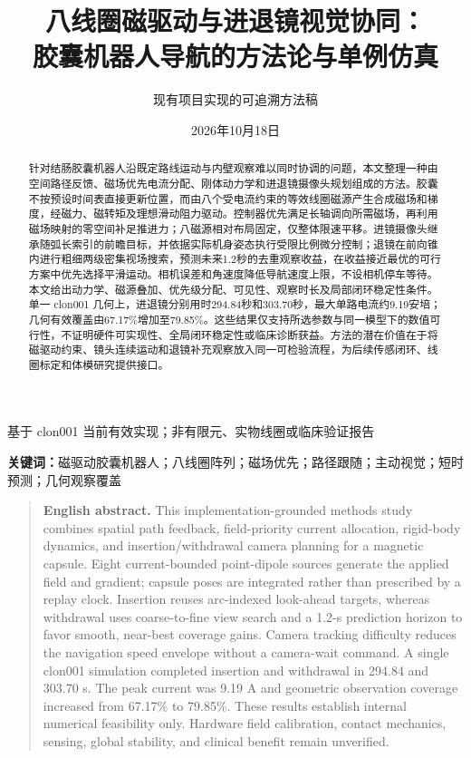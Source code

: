 \documentclass[UTF8,a4paper,zihao=5,fontset=windows]{ctexart}
\title{\heiti 八线圈磁驱动与进退镜视觉协同：\\胶囊机器人导航的方法论与单例仿真}
\author{现有项目实现的可追溯方法稿}
\date{2026年10月18日}
\begin{document}
\maketitle\vspace{-1em}
\begin{center}\small 基于 clon001 当前有效实现；非有限元、实物线圈或临床验证报告\end{center}
\begin{abstract}
针对结肠胶囊机器人沿既定路线运动与内壁观察难以同时协调的问题，本文整理一种由空间路径反馈、磁场优先电流分配、刚体动力学和进退镜摄像头规划组成的方法。胶囊不按预设时间表直接更新位置，而由八个受电流约束的等效线圈磁源产生合成磁场和梯度，经磁力、磁转矩及理想滑动阻力驱动。控制器优先满足长轴调向所需磁场，再利用磁场映射的零空间补足推进力；八磁源相对布局固定，仅整体限速平移。进镜摄像头继承随弧长索引的前瞻目标，并依据实际机身姿态执行受限比例微分控制；退镜在前向锥内进行粗细两级密集视场搜索，预测未来1.2秒的去重观察收益，在收益接近最优的可行方案中优先选择平滑运动。相机误差和角速度降低导航速度上限，不设相机停车等待。本文给出动力学、磁源叠加、优先级分配、可见性、观察时长及局部闭环稳定性条件。单一 clon001 几何上，进退镜分别用时294.84秒和303.70秒，最大单路电流约9.19安培；几何有效覆盖由67.17\%增加至79.85\%。这些结果仅支持所选参数与同一模型下的数值可行性，不证明硬件可实现性、全局闭环稳定性或临床诊断获益。方法的潜在价值在于将磁驱动约束、镜头连续运动和退镜补充观察放入同一可检验流程，为后续传感闭环、线圈标定和体模研究提供接口。
\end{abstract}
\noindent\textbf{关键词：}磁驱动胶囊机器人；八线圈阵列；磁场优先；路径跟随；主动视觉；短时预测；几何观察覆盖
\begin{quote}\small
\textbf{English abstract.} This implementation-grounded methods study combines spatial path feedback, field-priority current allocation, rigid-body dynamics, and insertion/withdrawal camera planning for a magnetic capsule. Eight current-bounded point-dipole sources generate the applied field and gradient; capsule poses are integrated rather than prescribed by a replay clock. Insertion reuses arc-indexed look-ahead targets, whereas withdrawal uses coarse-to-fine view search and a 1.2-s prediction horizon to favor smooth, near-best coverage gains. Camera tracking difficulty reduces the navigation speed envelope without a camera-wait command. A single clon001 simulation completed insertion and withdrawal in 294.84 and 303.70 s. The peak current was 9.19 A and geometric observation coverage increased from 67.17\% to 79.85\%. These results establish internal numerical feasibility only. Hardware field calibration, contact mechanics, sensing, global stability, and clinical benefit remain unverified.
\end{quote}
\clearpage\tableofcontents\clearpage
\end{document}
